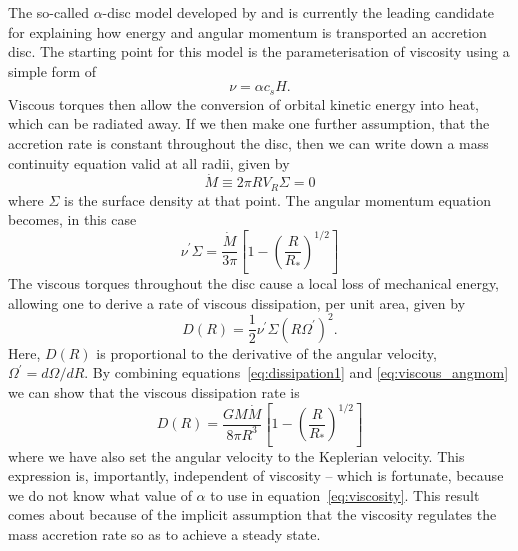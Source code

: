 The so-called $\alpha$-disc model developed by 
\cite[][hereafter SS73]{shakurasunyaev1973} and \cite{lyndenbell1969} is
currently the leading candidate for explaining how energy and angular momentum
is transported an accretion disc. The starting point for this model is the parameterisation
of viscosity using a simple form of
\begin{equation}
\nu = \alpha c_s H.
\label{eq:viscosity}
\end{equation}
Viscous torques then allow the conversion of orbital kinetic energy into heat, 
which can be radiated away. If we then make one further assumption, that the accretion rate is
constant throughout the disc, then we can write down a mass continuity equation
valid at all radii, given by
\begin{equation}
\dot{M} \equiv 2 \pi R V_R \Sigma = 0
\end{equation}
where $\Sigma$ is the surface density at that point. The angular momentum equation becomes, in this case
\begin{equation}
\nu^\prime \Sigma = \frac{\dot{M}}{3 \pi} \left[1 - \left( \frac{R}{R_*} \right)^{1/2} \right]
\label{eq:viscous_angmom}
\end{equation}
The viscous torques throughout the disc cause a local loss of mechanical energy, allowing 
one to derive \citep[see, e.g.][]{fkrbook} a rate of viscous dissipation, per unit area, given by
\begin{equation}
D(R) = \frac{1}{2} \nu^\prime \Sigma (R \Omega^\prime)^2.
\label{eq:dissipation1}
\end{equation}
Here, $D(R)$ is proportional to the derivative of the angular velocity, $\Omega^\prime=d\Omega/dR$.
By combining equations~\ref{eq:dissipation1} and \ref{eq:viscous_angmom} we can show that the 
viscous dissipation rate is 
\begin{equation}
D(R) = \frac{G M \dot{M}}{8 \pi R^3} \left[1 - \left( \frac{R}{R_*} \right)^{1/2} \right]
\label{eq:dissipation2}
\end{equation}
where we have also set the angular velocity to the Keplerian velocity. 
This expression is, importantly, independent of viscosity -- which is fortunate, because
we do not know what value of $\alpha$ to use in equation~\ref{eq:viscosity}.
This result comes about because of the implicit assumption that the viscosity regulates
the mass accretion rate so as to achieve a steady state.

